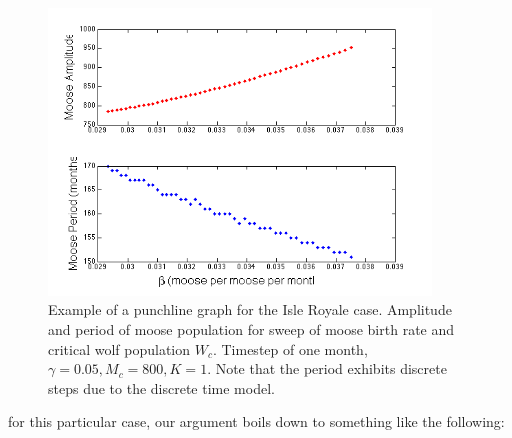 \documentclass{tufte-handout}
\begin{document}
\begin{figure}[h!]
\includegraphics[width=4in]{figs/MooseBCSweepClean}
\caption{Example of a punchline graph for the Isle Royale case.  Amplitude and period of moose population for sweep of moose birth rate and critical wolf population $W_c$.  Timestep of one month,  $\gamma = 0.05, M_c = 800, K=1$.  Note that the period exhibits discrete steps due to the discrete time model.}
\end{figure}

\clearpage

 for this particular case, our argument boils down to something like the following:
\end{document}
